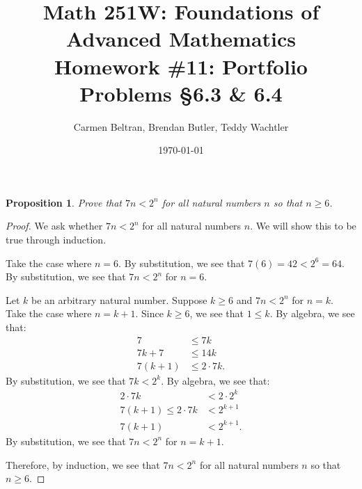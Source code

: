 \documentclass{amsart}
\newtheorem*{proposition}{Proposition}
\numberwithin{equation}{section}
\begin{document}
	\title[Math 251W: Homework \#11] {
		Math 251W: Foundations of Advanced Mathematics \\
		\textmd{Homework \#11: Portfolio Problems \S 6.3 \& 6.4}}
	\author{Carmen Beltran, Brendan Butler, Teddy Wachtler}
	\date{\today}

	\maketitle

	\begin{problem}[manual-num=57]
		\begin{proposition}
			Prove that $7n < 2^n$ for all natural numbers $n$ so that $n \geq 6$.
		\end{proposition}

		\begin{proof}
			We ask whether $7n < 2^n$ for all natural numbers $n$.
			We will show this to be true through induction.

			Take the case where $n = 6$.
			By substitution, we see that $7(6) = 42 < 2^6 = 64$.
			By substitution, we see that $7n < 2^n$ for $n = 6$.

			Let $k$ be an arbitrary natural number. Suppose $k \geq 6$ and $7n < 2^n$ for $n = k$.
			Take the case where $n = k + 1$.
			Since $k \geq 6$, we see that $1 \leq k$.
			By algebra, we see that:
			\begin{align*}
				7 &\leq 7k \\
				7k + 7 &\leq 14k \\
				7(k + 1) &\leq 2 \cdot 7k.
			\end{align*}
			By substitution, we see that $7k < 2^k$.
			By algebra, we see that:
			\begin{align*}
				2 \cdot 7k &< 2 \cdot 2^k \\
				7(k + 1) \leq 2 \cdot 7k &< 2^{k + 1} \\
				7(k + 1) &< 2^{k + 1}.
			\end{align*}
			By substitution, we see that $7n < 2^n$ for $n = k + 1$.

			Therefore, by induction, we see that $7n < 2^n$ for all natural numbers $n$ so that $n \geq 6$.
		\end{proof}
	\end{problem}
\end{document}
